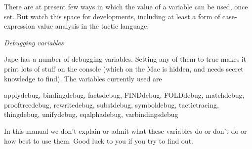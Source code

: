 \documentclass[11pt]{book}
\begin{document}
There are at present few ways in which the value of a variable can be used, once set. But watch this space for developments, including at least a form of case-expression value analysis in the tactic language.


\textit{Debugging variables}


Jape has a number of debugging variables. Setting any of them to true makes it print lots of stuff on the console (which on the Mac is hidden, and needs secret knowledge to find). The variables currently used are


applydebug, bindingdebug, factsdebug, FINDdebug, FOLDdebug, matchdebug, prooftreedebug, rewritedebug, substdebug, symboldebug, tactictracing, thingdebug, unifydebug, eqalphadebug, varbindingsdebug


In this manual we don't explain or admit what these variables do or don't do or how best to use them. Good luck to you if you try to find out.
\end{document}
